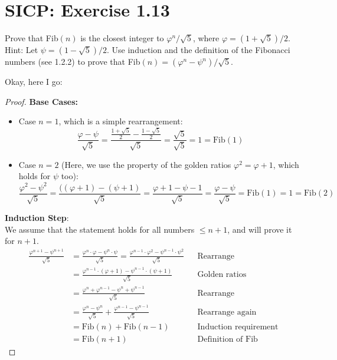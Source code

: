 \documentclass[12pt,a4paper]{article}
\newcommand{\Fib}{\mathrm{Fib}}
\begin{document}
\section*{SICP: Exercise 1.13}
\begin{displayquote}
Prove that Fib$(n)$ is the closest integer to
$\varphi^n / \sqrt{5}$, where $\varphi = (1 + \sqrt{5})/2$. 
Hint: Let $\psi = (1 - \sqrt{5})/2$. 
Use induction and the definition of the Fibonacci numbers (see 1.2.2) to prove that Fib$(n) = (\varphi^n - \psi^n)/\sqrt{5}$.
\end{displayquote}

Okay, here I go:

\begin{proof}
\textbf{Base Cases:}
\begin{itemize}
  \item Case ${n = 1}$, which is a simple rearrangement:
\[
\frac{\varphi - \psi}{\sqrt{5}} = \frac{\frac{1 + \sqrt{5}}{2} - \frac{1 - \sqrt{5}}{2}}{\sqrt{5}} = \frac{\sqrt{5}}{\sqrt{5}} = 1 = \Fib(1)
\]
  \item Case ${n = 2}$ (Here, we use the property of the golden ratios $\varphi^2 = \varphi + 1$, which holds for $\psi$ too):
\[
  \frac{\varphi^2 - \psi^2}{\sqrt{5}} = \frac{((\varphi + 1) - (\psi + 1)}{\sqrt{5}} = \frac{\varphi + 1 - \psi - 1}{\sqrt{5}} = \frac{\varphi - \psi}{\sqrt{5}} = \Fib(1) = 1 = \Fib(2)
\]
\end{itemize}

\noindent{}\textbf{Induction Step}:\\
We assume that the statement holds for all numbers $\leq n+1$, and will prove it for $n+1$.
\[
\begin{aligned}
  \frac{\varphi^{n+1} - \psi^{n+1}}{\sqrt{5}} &= \frac{\varphi^{n} \cdot \varphi - \psi^{n} \cdot \psi}{\sqrt{5}}
                                              = \frac{\varphi^{n-1} \cdot \varphi^2 - \psi^{n-1} \cdot \psi^2}{\sqrt{5}} && \text{Rearrange}\\
                                             &= \frac{\varphi^{n-1} \cdot (\varphi + 1) - \psi^{n-1} \cdot (\psi+1)}{\sqrt{5}} && \text{Golden ratios}\\
                                             &= \frac{\varphi^{n} + \varphi^{n-1} - \psi^{n} + \psi^{n-1}}{\sqrt{5}} && \text{Rearrange}\\
                                             &= \frac{\varphi^{n} - \psi^{n}}{\sqrt{5}} + \frac{\varphi^{n-1} - \psi^{n-1}}{\sqrt{5}} && \text{Rearrange again}\\
                                             &= \Fib(n) + \Fib(n-1) && \text{Induction requirement}\\
                                             &= \Fib(n+1) && \text{Definition of Fib}
\end{aligned}
\]
\end{proof}
\end{document}
